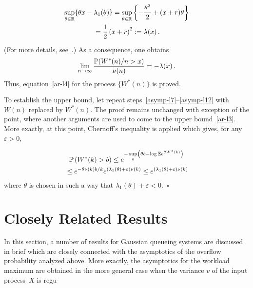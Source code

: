 \begin{multicols}{2}
\noindent
\begin{multline*}
\sup\limits_{\theta \in \mathbb R}\{\theta x-\lambda_1(\theta)\}=
\sup\limits_{\theta \in \mathbb R}\left\{ -\displaystyle\frac{\displaystyle \theta^2\mathstrut}{\displaystyle 2\mathstrut}+(x+r)\theta
\right\}\\
{}=\displaystyle\frac{\displaystyle 1\mathstrut}{\displaystyle 2\mathstrut}\left(x+r\right)^2:=\lambda(x)\,.
\end{multline*}
(For more details, see~\cite{Dembo}.) As a consequence, one obtains
$$
\lim\limits_{n \to \infty} \displaystyle\frac{\displaystyle \mathbb{P} (W^*(n)/n > x)\mathstrut}{\displaystyle \nu(n)\mathstrut} =-\lambda (x)\,.
$$
Thus,   equation~\eqref{ar-l4} for the process $\{ W^*(n) \}$ is
proved.

\smallskip

To establish   the upper bound,  let  repeat
steps~\eqref{asymp-l7}--\eqref{asymp-l12} with $W(n)$ replaced by
$W^*(n)$. The proof
remains unchanged with exception of the point, where another
arguments are used to come to the  upper bound~\eqref{ar-l3}. More exactly,
at this point, Chernoff's  inequality is applied which gives, for any
$\varepsilon>0$,

\noindent
\begin{multline*}
\mathbb{P} \left(W^*(k)>b \right) \leq e^{-\sup\limits_{\theta}\left( \theta b -\log \mathbb E
e^{\theta W^*(k)} \right)}\\
{}\leq  e^{-\theta \nu(k) b/k}e^{(\lambda_1(\theta)+\varepsilon)\nu(k)}
\leq e^{(\lambda_1(\theta)+\varepsilon)\nu(k)}
\end{multline*}
where $\theta$ is chosen in such a way  that
$\lambda_1(\theta)+\varepsilon<0$.~\hfill$\square$

\vspace*{-6pt}


\section{Closely Related Results}

\noindent
In this section,  a number of results for
Gaussian queueing systems are discussed in brief which are closely connected  with the
asymptotics of the overflow probability  analyzed above.
  More exactly,  the   asymptotics   for the workload
 maximum are obtained
in the more general case when the variance $v$ of the input process~$X$
is regu-\linebreak\vspace*{-12pt}

\pagebreak


\end{multicols}
